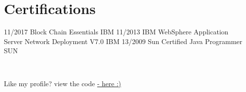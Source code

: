 \documentclass[]{friggeri-cv}
\begin{document}
\section{Certifications}
\begin{entrylist}
  \entry
    {11/2017}
    {Block Chain Essentials}
    {IBM}
    {}
    \entry
    {11/2013}
    {IBM WebSphere Application Server Network Deployment V7.0}
    {IBM}
    {}
    \entry
    {13/2009}
    {Sun Certified Java Programmer}
    {SUN}
    {}
\end{entrylist}


    ~
    ~
    ~


\begin{flushright}
\footnotesize{}
\footnotesize {}
\footnotesize{ Like my profile? view the code \href{https://github.com/satheeshCharles/Satheesh_Charles_DevOps_Profile}{ - here :) }} \\
\end{flushright}
\end{document}
